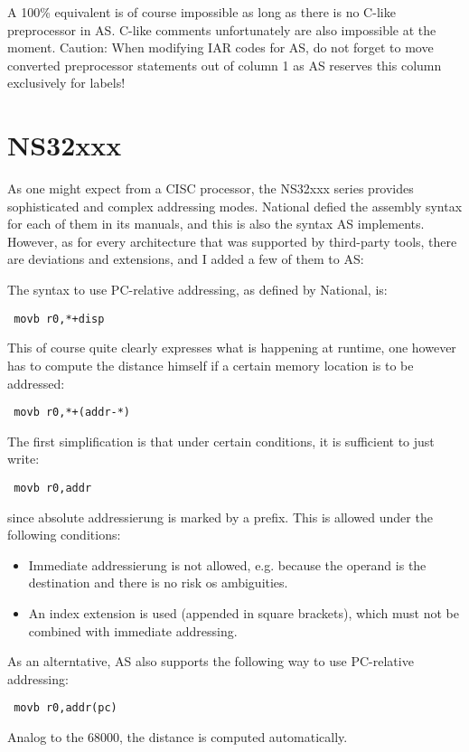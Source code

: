 \documentclass[12pt,twoside]{report}
\begin{document}
A 100\% equivalent is of course impossible as long as there is no C-like
preprocessor in AS.  C-like comments unfortunately are also impossible
at the moment.  Caution: When modifying IAR codes for AS, do not forget to
move converted preprocessor statements out of column 1 as AS reserves this
column exclusively for labels!


\section{NS32xxx}

As one might expect from a CISC processor, the NS32xxx series provides
sophisticated and complex addressing modes.  National defied the assembly syntax
for each of them in its manuals, and this is also the syntax AS implements.
However, as for every architecture that was supported by third-party tools,
there are deviations and extensions, and I added a few of them to AS:

The syntax to use PC-relative addressing, as defined by National, is:
\begin{verbatim}
 movb r0,*+disp
\end{verbatim}
This of course quite clearly expresses what is happening at runtime, one however
has to compute the distance himself if a certain memory location is to be
addressed:
\begin{verbatim}
 movb r0,*+(addr-*)
\end{verbatim}
The first simplification is that under certain conditions, it is sufficient to
just write:
\begin{verbatim}
 movb r0,addr
\end{verbatim}
since absolute addressierung is marked by a \@ prefix.  This is allowed under
the following conditions:
\begin{itemize}
\item{Immediate addressierung is not allowed, e.g. because the operand is
      the destination and there is no risk os ambiguities.}
\item{An index extension is used (appended in square brackets), which must not
      be combined with immediate addressing.}
\end{itemize}
As an alterntative, AS also supports the following way to use PC-relative addressing:
\begin{verbatim}
 movb r0,addr(pc)
\end{verbatim}
Analog to the 68000, the distance is computed automatically.
\end{document}
